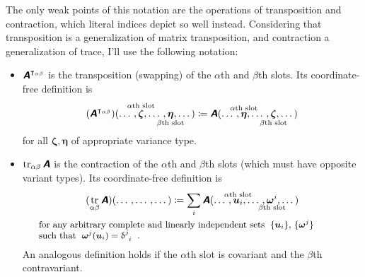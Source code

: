 \documentclass[a4paper,12pt,onecolumn,oneside,article,british]{memoir}
\newcommand*{\mathte}[1]{\textbf{\textit{\textsf{#1}}}}
\newcommand*{\delt}{\updelta}%
\DeclareMathOperator{\tr}{tr}%
\newcommand*{\defd}{\coloneqq}
\DeclarePairedDelimiter\set{\{}{\}}
\newcommand*{\tsum}{\mathop{\textstyle\sum}\nolimits}
\newcommand*{\yA}{\mathte{A}}
\renewcommand*{\i}{\indices}
\newcommand*{\id}{\mathbf{id}}%
\begin{document}
The only weak points of this notation are the operations of transposition
and contraction, which literal indices depict so well instead. Considering
that transposition is a generalization of matrix transposition, and
contraction a generalization of trace, I'll use the following notation:
\begin{itemize}[wide]%
\item $\yA^{\intercal_{\alpha\beta}}$ is the transposition
  (swapping) of the $\alpha$th and $\beta$th slots. Its coordinate-free
  definition is
  \begin{equation}
    \label{eq:def_transp}
    (\yA^{\intercal_{\alpha\beta}})(\dotso,
    \overset{\mathclap{\scriptstyle\text{$\alpha$th slot}}}{\bm{\zeta}}
    ,\dotso,
    \underset{\mathclap{\scriptstyle\text{$\beta$th slot}}}{\bm{\eta}}
    ,\dotso)
    \defd
    \yA(\dotso,
    \overset{\mathclap{\scriptstyle\text{$\alpha$th slot}}}{\bm{\eta}}
    ,\dotso,
    \underset{\mathclap{\scriptstyle\text{$\beta$th slot}}}{\bm{\zeta}}
    ,\dotso)
  \end{equation}
  for all $\bm{\zeta},\bm{\eta}$ of appropriate variance type.
\item $\tr_{\alpha\beta}\yA$ is the contraction of the $\alpha$th and
  $\beta$th slots (which must have opposite variant types). Its
  coordinate-free definition is
  \begin{equation}
    \label{eq:def_contr}
    \begin{gathered}
      (\tr_{\alpha\beta}\yA)(\dotso
        ,\dotso
        ,\dotso)
        \defd
        \sum_{i} \yA(\dotso,
        \overset{\mathclap{\scriptstyle\text{$\alpha$th slot}}}{\bm{u}_{i}}
        ,\dotso,
        \underset{\mathclap{\scriptstyle\text{$\beta$th slot}}}{\bm{\omega}^{i}}
        ,\dotso)
      \\
      \parbox{0.9\columnwidth}{\small for any arbitrary complete and
        linearly independent sets \;$\set{\bm{u}_{i}}$,
        $\set{\bm{\omega}^{j}}$\\
        such that \;$\bm{\omega}^{j}(\bm{u}_{i}) = \delt\i{^{j}_{i}}$ \;.}
    \end{gathered}
  \end{equation}
  An analogous definition holds if the $\alpha$th slot is covariant and the
  $\beta$th contravariant.
\end{itemize}
\end{document}
